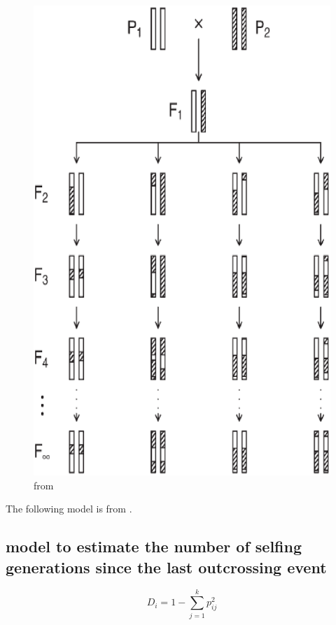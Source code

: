 \documentclass[a4paper,10pt]{article}
\begin{document}
\begin{figure}
\includegraphics[width=1\textwidth]{figures/selfing_diagram.eps}
\caption{from \cite{Broman2005}}\label{f6}
\end{figure}

The following model is from \cite{Enjalbert2000}.

\subsection{model to estimate the number of selfing generations since the last outcrossing event}
\begin{equation}
D_i = 1 - \sum_{j=1}^k p_{ij}^2
\end{equation}
\end{document}
